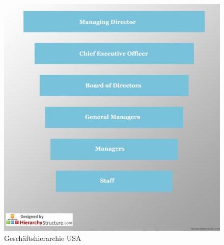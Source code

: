 \begin{figure}[ht]
\centering
\includegraphics[width=0.7\linewidth]{./images/USA-Business-Hierarchy}
\caption{Geschäftshierarchie USA \cite{HierarchieUSA}}
\label{fig:USA-Business-Hierarchy}
\end{figure}


